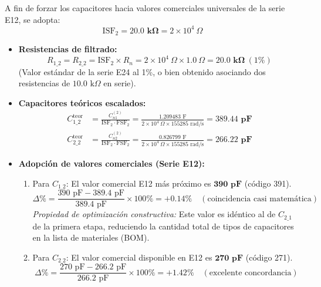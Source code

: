 \documentclass[a4paper,11pt]{article}
\begin{document}
A fin de forzar los capacitores hacia valores comerciales universales de la serie E12, se adopta:
\begin{equation}
\text{ISF}_2 = \mathbf{20.0\text{ k}\Omega} = 2 \times 10^4\ \Omega
\end{equation}
\begin{itemize}
    \item \textbf{Resistencias de filtrado:}
    \begin{equation}
    R_{1\_2} = R_{2\_2} = \text{ISF}_2 \times R_n = 2\times 10^4\ \Omega \times 1.0\ \Omega = \mathbf{20.0\text{ k}\Omega}\ (1\%)
    \end{equation}
    (Valor estándar de la serie E24 al 1\%, o bien obtenido asociando dos resistencias de $10.0\text{ k}\Omega$ en serie).
    \item \textbf{Capacitores teóricos escalados:}
    \begin{align}
    C_{1\_2}^{\text{teor}} &= \frac{C_{n1}^{(2)}}{\text{ISF}_2 \cdot \text{FSF}_2} = \frac{1.209483\text{ F}}{2\times 10^4\ \Omega \times 155285\text{ rad/s}} = \mathbf{389.44\text{ pF}} \\
    C_{2\_2}^{\text{teor}} &= \frac{C_{n2}^{(2)}}{\text{ISF}_2 \cdot \text{FSF}_2} = \frac{0.826799\text{ F}}{2\times 10^4\ \Omega \times 155285\text{ rad/s}} = \mathbf{266.22\text{ pF}}
    \end{align}
    \item \textbf{Adopción de valores comerciales (Serie E12):}
    \begin{enumerate}
        \item Para $C_{1\_2}$: El valor comercial E12 más próximo es $\mathbf{390\text{ pF}}$ (código 391).
        \begin{equation*}
        \Delta\% = \frac{390\text{ pF} - 389.4\text{ pF}}{389.4\text{ pF}} \times 100\% = \mathbf{+0.14\%}\quad (\text{coincidencia casi matemática})
        \end{equation*}
        \textit{Propiedad de optimización constructiva:} Este valor es idéntico al de $C_{2\_1}$ de la primera etapa, reduciendo la cantidad total de tipos de capacitores en la lista de materiales (BOM).
        \item Para $C_{2\_2}$: El valor comercial disponible en E12 es $\mathbf{270\text{ pF}}$ (código 271).
        \begin{equation*}
        \Delta\% = \frac{270\text{ pF} - 266.2\text{ pF}}{266.2\text{ pF}} \times 100\% = \mathbf{+1.42\%}\quad (\text{excelente concordancia})
        \end{equation*}
    \end{enumerate}
\end{itemize}
\end{document}
